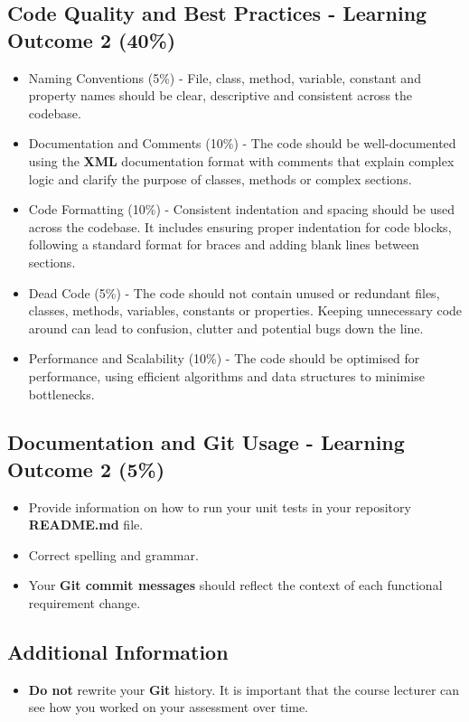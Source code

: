 \documentclass{article}
\begin{document}
\subsection*{Code Quality and Best Practices - Learning Outcome 2 (40\%)}
\begin{itemize}
    \item Naming Conventions (5\%) - File, class, method, variable, constant and property names should be clear, descriptive and consistent across the codebase. 
    \item Documentation and Comments (10\%) - The code should be well-documented using the \textbf{XML} documentation format with comments that explain complex logic and clarify the purpose of classes, methods or complex sections. 
    \item Code Formatting (10\%) - Consistent indentation and spacing should be used across the codebase. It includes ensuring proper indentation for code blocks, following a standard format for braces and adding blank lines between sections.
    \item Dead Code (5\%) - The code should not contain unused or redundant files, classes, methods, variables, constants or properties. Keeping unnecessary code around can lead to confusion, clutter and potential bugs down the line.
    \item Performance and Scalability (10\%) - The code should be optimised for performance, using efficient algorithms and data structures to minimise bottlenecks. 
\end{itemize}

\subsection*{Documentation and Git Usage - Learning Outcome 2 (5\%)}
\begin{itemize}
    \item Provide information on how to run your unit tests in your repository \textbf{README.md} file.
     \item Correct spelling and grammar.
    \item Your \textbf{Git commit messages} should reflect the context of each functional requirement change.
\end{itemize}

\subsection*{Additional Information}
\begin{itemize}
    \item \textbf{Do not} rewrite your \textbf{Git} history. It is important that the course lecturer can see how you worked on your assessment over time.
\end{itemize}
\end{document}
